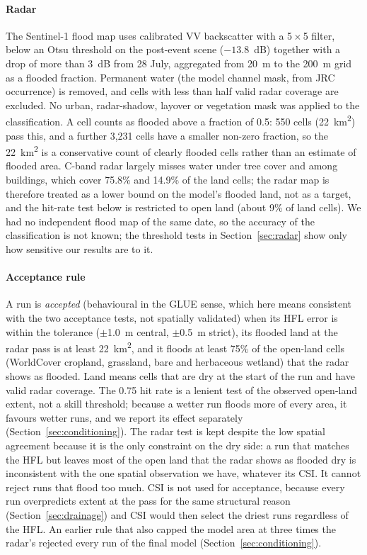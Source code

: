 \documentclass[preprint,12pt,authoryear]{elsarticle}
\newcommand{\kmsq}{km\textsuperscript{2}}
\begin{document}
\paragraph{Radar} The Sentinel-1 flood map uses calibrated VV backscatter with a 5\,$\times$\,5 filter, below an Otsu threshold on the post-event scene ($-13.8$~dB) together with a drop of more than 3~dB from 28 July, aggregated from 20~m to the 200~m grid as a flooded fraction. Permanent water (the model channel mask, from JRC occurrence) is removed, and cells with less than half valid radar coverage are excluded. No urban, radar-shadow, layover or vegetation mask was applied to the classification. A cell counts as flooded above a fraction of 0.5: 550 cells (22~\kmsq) pass this, and a further 3,231 cells have a smaller non-zero fraction, so the 22~\kmsq{} is a conservative count of clearly flooded cells rather than an estimate of flooded area. C-band radar largely misses water under tree cover and among buildings, which cover 75.8\% and 14.9\% of the land cells; the radar map is therefore treated as a lower bound on the model's flooded land, not as a target, and the hit-rate test below is restricted to open land (about 9\% of land cells). We had no independent flood map of the same date, so the accuracy of the classification is not known; the threshold tests in Section~\ref{sec:radar} show only how sensitive our results are to it.

\paragraph{Acceptance rule} A run is \emph{accepted} (behavioural in the GLUE sense, which here means consistent with the two acceptance tests, not spatially validated) when its HFL error is within the tolerance ($\pm$1.0~m central, $\pm$0.5~m strict), its flooded land at the radar pass is at least 22~\kmsq, and it floods at least 75\% of the open-land cells (WorldCover cropland, grassland, bare and herbaceous wetland) that the radar shows as flooded. Land means cells that are dry at the start of the run and have valid radar coverage. The 0.75 hit rate is a lenient test of the observed open-land extent, not a skill threshold; because a wetter run floods more of every area, it favours wetter runs, and we report its effect separately (Section~\ref{sec:conditioning}). The radar test is kept despite the low spatial agreement because it is the only constraint on the dry side: a run that matches the HFL but leaves most of the open land that the radar shows as flooded dry is inconsistent with the one spatial observation we have, whatever its CSI. It cannot reject runs that flood too much. CSI is not used for acceptance, because every run overpredicts extent at the pass for the same structural reason (Section~\ref{sec:drainage}) and CSI would then select the driest runs regardless of the HFL. An earlier rule that also capped the model area at three times the radar's rejected every run of the final model (Section~\ref{sec:conditioning}).
\end{document}
